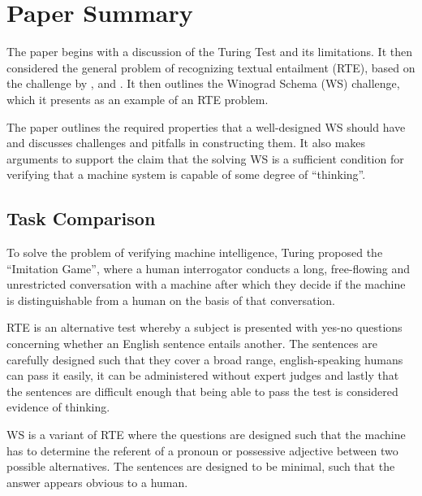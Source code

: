 \documentclass[
10pt, %
a4paper, %
oneside, %
headinclude,footinclude, %
BCOR5mm, %
]{scrartcl}
\begin{document}
\section{Paper Summary}
The paper begins with a discussion of the Turing Test and its limitations. It then considered the general problem of recognizing textual entailment (RTE), based on the challenge by \citet{dagan2006pascal}, \citet{bobrow2007precision} and \citet{rus2008study}. It then outlines the Winograd Schema (WS) challenge, which it presents as an example of an RTE problem.

The paper outlines the required properties that a well-designed WS should have and discusses challenges and pitfalls in constructing them. It also makes arguments to support the claim that the solving WS is a sufficient condition for verifying that a machine system is capable of some degree of ``thinking''.

\subsection{Task Comparison}
To solve the problem of verifying machine intelligence, Turing proposed the ``Imitation Game'', where a human interrogator conducts a long, free-flowing and unrestricted conversation with a machine after which they decide if the machine is distinguishable from a human on the basis of that conversation.

RTE is an alternative test whereby a subject is presented with yes-no questions concerning whether an English sentence entails another. The sentences are carefully designed such that they cover a broad range, english-speaking humans can pass it easily, it can be administered without expert judges and lastly that the sentences are difficult enough that being able to pass the test is considered evidence of thinking.

WS is a variant of RTE where the questions are designed such that the machine has to determine the referent of a pronoun or possessive adjective between two possible alternatives. The sentences are designed to be minimal, such that the answer appears obvious to a human.
\end{document}
